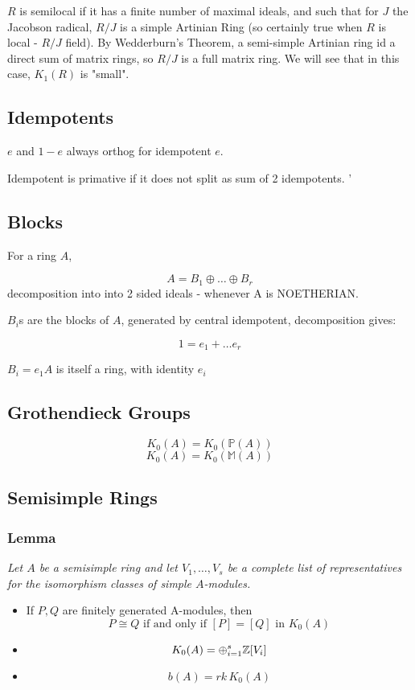 $R$ is semilocal if it has a finite number of maximal ideals, and such that for $J$ the Jacobson radical, $R/J$ is a simple Artinian Ring (so certainly true when $R$ is local - $R/J$ field). By Wedderburn's Theorem, a semi-simple Artinian ring id a direct sum of matrix rings, so $R/J$ is a full matrix ring. We will see that in this case, $K_1(R)$ is "small". 



\subsection{Idempotents}
$e$ and $1-e$ always orthog for idempotent $e$.

Idempotent is primative if it does not split as sum of 2 idempotents.
'
\subsection{Blocks}
For a ring $A$,

$$A = B_1 \oplus \dots \oplus B_r$$
 decomposition into into 2 sided ideals - whenever A is NOETHERIAN.
 
 $B_i$s are the blocks of $A$, generated by central idempotent, decomposition gives:
 
 $$1 = e_1 + \dots e_r$$
 
 $B_i = e_1 A$ is itself a ring, with identity $e_i$
 
 \subsection{Grothendieck Groups}
 
 $$K_0 (A) = K_0 (\mathbb P (A))$$
 $$K_0 (A) = K_0 (\mathbb M (A)) $$

\subsection{Semisimple Rings}
\subsubsection{Lemma}
\emph{Let $A$ be a semisimple ring and let $V_1, \dots ,V_s$ be a complete list of representatives for the isomorphism classes of simple $A$-modules.}
\begin{itemize}
\item If $P,Q$ are finitely generated A-modules, then
$$P\cong Q \text{ if and only if } [P] = [Q] \text{ in } K_0(A)$$
\item $$K_0(A) = \oplus_{i=1}^s \mathbb Z [V_i]$$
\item $$b(A) = rk\, K_0(A)$$
\end{itemize}

